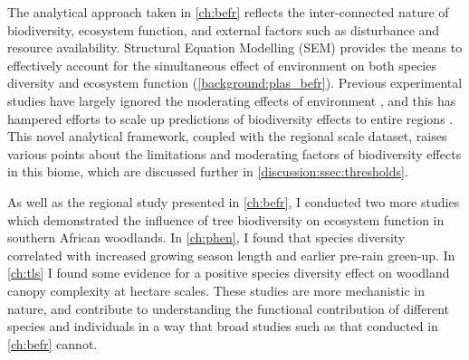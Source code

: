 \begin{refsection}
The analytical approach taken in \autoref{ch:befr} reflects the inter-connected nature of biodiversity, ecosystem function, and external factors such as disturbance and resource availability. Structural Equation Modelling (SEM) provides the means to effectively account for the simultaneous effect of environment on both species diversity and ecosystem function (\autoref{background:plas_befr}). Previous experimental studies have largely ignored the moderating effects of environment \citep{}, and this has hampered efforts to scale up predictions of biodiversity effects to entire regions \citep{}. This novel analytical framework, coupled with the regional scale dataset, raises various points about the limitations and moderating factors of biodiversity effects in this biome, which are discussed further in \autoref{discussion:ssec:thresholds}.

As well as the regional study presented in \autoref{ch:befr}, I conducted two more studies which demonstrated the influence of tree biodiversity on ecosystem function in southern African woodlands. In \autoref{ch:phen}, I found that species diversity correlated with increased growing season length and earlier pre-rain green-up. In \autoref{ch:tls} I found some evidence for a positive species diversity effect on woodland canopy complexity at hectare scales. These studies are more mechanistic in nature, and contribute to understanding the functional contribution of different species and individuals in a way that broad studies such as that conducted in \autoref{ch:befr} cannot. 


\end{refsection}
